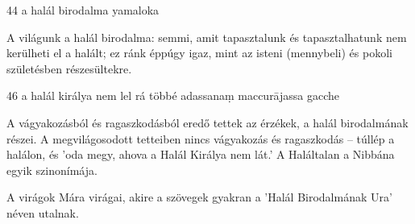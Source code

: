 
\begin{notesdescription}

\item[{44}
{a halál birodalma}
{yamaloka}] \hfill\par

A világunk a halál birodalma: semmi, amit tapasztalunk és tapasztalhatunk nem kerülheti el a halált; ez ránk éppúgy igaz, mint az isteni (mennybeli) és pokoli születésben részesültekre.

\item[{46}
{a halál királya nem lel rá többé}
{adassanaṃ maccurājassa gacche}] \hfill\par

A vágyakozásból és ragaszkodásból eredő tettek az érzékek, a halál birodalmának részei. A megvilágosodott tetteiben nincs vágyakozás és ragaszkodás -- túllép a halálon, és 'oda megy, ahova a Halál Királya nem lát.' A Haláltalan a Nibbána egyik szinonímája.

A virágok Mára virágai, akire a szövegek gyakran a 'Halál Birodalmának Ura' néven utalnak.

\end{notesdescription}
